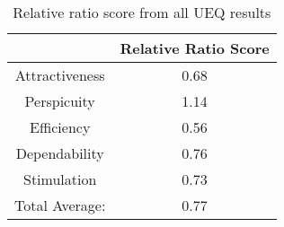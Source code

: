 \begin{table}[ht]
    \centering
    \begin{tabular}{ |c|c| } 
        \hline
        \rowcolor{light-gray}
          & Relative Ratio Score \\
        \hline
        Attractiveness & 0.68 \\
        \hline
        Perspicuity & 1.14 \\
        \hline
        Efficiency & 0.56 \\
        \hline
        Dependability &  0.76 \\
        \hline
        Stimulation & 0.73 \\
        \hline
        Total Average: & 0.77 \\
        \hline
    \end{tabular}
    \caption{Relative ratio score from all UEQ results}
    \label{tab:relative-ratio-all}
\end{table}